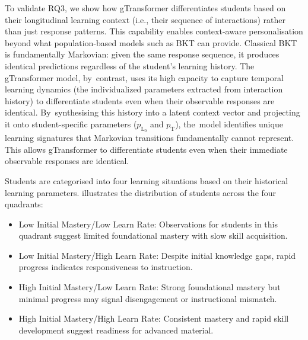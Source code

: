 \documentclass[applsci,article,accept,moreauthors,pdftex]{Definitions/mdpi}
\begin{document}
To validate RQ3, we show how gTransformer differentiates students based on their longitudinal learning context (i.e., their sequence of interactions) rather than just response patterns. This capability enables context-aware personalisation beyond what population-based models such as BKT can provide. Classical BKT is fundamentally Markovian: given the same response sequence, it produces identical predictions regardless of the student's learning history. {The gTransformer model, by~contrast, uses its high capacity to capture temporal learning dynamics (the individualized parameters extracted from interaction history) to differentiate students even when their observable responses are identical. By~synthesising this history into a latent context vector and projecting it onto student-specific parameters ($p_{\text{L}_0}$ and $p_{\text{T}}$), the~model identifies unique learning signatures that Markovian transitions fundamentally cannot represent. This allows gTransformer to differentiate students even when their immediate observable responses are identical.}


Students are {categorised} into four learning situations based on their historical learning parameters.  illustrates the distribution of students across the four quadrants:

\begin{itemize}
    \item Low Initial Mastery/Low Learn Rate: Observations for students in this quadrant suggest limited foundational mastery with slow skill acquisition. 
    \item Low Initial Mastery/High Learn Rate: Despite initial knowledge gaps, rapid progress indicates responsiveness to instruction. 
    \item High Initial Mastery/Low Learn Rate: Strong foundational mastery but minimal progress may signal disengagement or instructional mismatch. 
    \item High Initial Mastery/High Learn Rate: Consistent mastery and rapid skill development suggest readiness for advanced material.
\end{itemize}
\vspace{-9pt}
\end{document}
